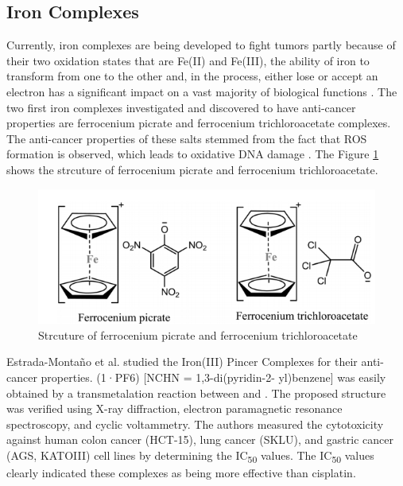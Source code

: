 \subsection{Iron Complexes}
\hspace{0.1cm}Currently, iron complexes are being developed to fight tumors partly because of their two oxidation states that are Fe(II) and Fe(III), the ability of iron to transform from one to the other and, in the process, either lose or accept an electron has a significant impact on a vast majority of biological functions \cite{fairweather2004iron}. The two first iron complexes investigated and discovered to have anti-cancer properties are ferrocenium picrate and ferrocenium trichloroacetate complexes. The anti-cancer properties of these salts stemmed from the fact that ROS formation is observed, which leads to oxidative DNA damage \cite{kopf1984ferricenium}. The Figure \ref{fig:ironone} shows the strcuture of ferrocenium picrate and ferrocenium trichloroacetate.

\begin{figure}[!ht]
    \centering
    \includegraphics[scale = 0.55]{ironone.png}
    \caption{Strcuture of ferrocenium picrate and ferrocenium trichloroacetate}
    \label{fig:ironone}
\end{figure}

\hspace{0.1cm}Estrada-Montaño et al.\cite{estrada2017iron} studied the Iron(III) Pincer Complexes for their anti-cancer properties.  (1·PF6) [NCHN = 1,3-di(pyridin-2- yl)benzene] was easily obtained by a transmetalation reaction between \ce{[Fe3(CO)12]} and . The proposed structure was verified using  X-ray diffraction, electron paramagnetic resonance spectroscopy, and cyclic voltammetry. The authors measured the cytotoxicity against human colon cancer (HCT-15), lung cancer (SKLU), and gastric cancer (AGS, KATOIII) cell lines by determining the IC\textsubscript{50} values. The IC\textsubscript{50} values clearly indicated these complexes as being more effective than cisplatin.

